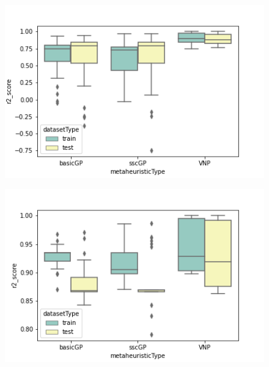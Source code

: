 \documentclass[main.tex]{subfiles}
\begin{document}
\begin{figure}
\centering
\begin{minipage}{.5\textwidth}
  \centering
  \includegraphics[width=1.1\linewidth]{../images/f5.png}
  \label{fig:f5}
\end{minipage}%
\begin{minipage}{.5\textwidth}
  \centering
  \includegraphics[width=1.1\linewidth]{../images/f6.png}
  \label{fig:f6}
\end{minipage}
\end{figure}
\end{document}

